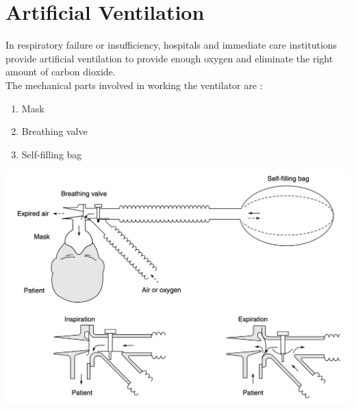 \documentclass{article}
\begin{document}
\section{Artificial Ventilation}
In respiratory failure or insufficiency, hospitals and immediate care institutions provide artificial ventilation to provide enough oxygen and eliminate the right amount of carbon dioxide. \\The mechanical parts involved in working the ventilator are :
\begin{enumerate}
    \item Mask 
    \item Breathing valve
    \item Self-filling bag
\end{enumerate}
\begin{center}
    \includegraphics[scale=0.5]{Screenshot 2023-04-29 at 4.09.21 PM.png}
\end{center}
\end{document}
